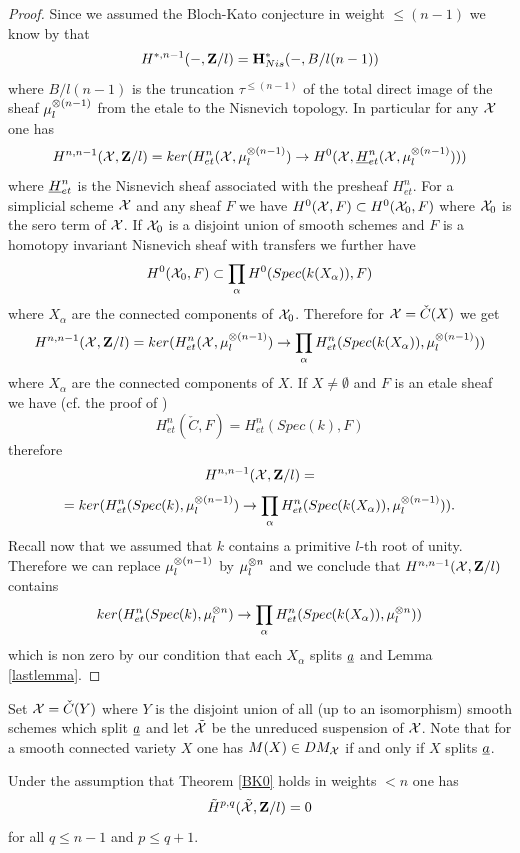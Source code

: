 \documentclass[11pt]{article}
\begin{document}
\begin{proof}
Since we assumed the Bloch-Kato conjecture in weight $\le (n-1)$ we
know by \cite{MCpub} that 
%
$$H^{*,n-1}(-,{\bf Z\rm}/l)={\bf H}^{*}_{Nis}(-,B/l(n-1))$$
%
where $B/l(n-1)$ is the truncation $\tau^{\le(n-1)}$ of the total
direct image of the sheaf $\mu_l^{\otimes(n-1)}$ from the etale to the
Nisnevich topology. In particular for any ${\cal X}$ one has
%
$$H^{n,n-1}({\cal X},{\bf Z\rm}/l)=ker(H^n_{et}({\cal X},\mu_l^{\otimes(n-1)})\rightarrow
H^0({\cal X}, \underline{H}^n_{et}({\cal X},\mu_l^{\otimes(n-1)})))$$
%
where $\underline{H}^n_{et}$ is the Nisnevich sheaf associated with the
presheaf $H^{n}_{et}$. For a simplicial scheme $\cal X$ and any
sheaf $F$ we have $H^0({\cal X},F)\subset H^0({\cal X}_0,F)$ where
${\cal X}_0$ is the sero term of $\cal X$. If ${\cal X}_0$ is a
disjoint union of smooth schemes and $F$ is a homotopy invariant
Nisnevich sheaf with transfers we further have
%
$$H^0({\cal X}_0,F)\subset \prod_{\alpha} H^0(Spec(k(X_{\alpha})),F)$$
%
where $X_{\alpha}$ are the connected components of ${\cal X}_0$.
%
Therefore for ${\cal X}=\check{C}(X)$ we get
%
$$H^{n,n-1}({\cal X},{\bf Z\rm}/l)=ker(H^n_{et}({\cal X},\mu_l^{\otimes(n-1)})\rightarrow
\prod_{\alpha} H^n_{et}(Spec(k(X_{\alpha})),\mu_l^{\otimes(n-1)}))$$
%
where $X_{\alpha}$ are the connected components of $X$. If $X\ne
\emptyset$ and $F$ is an etale sheaf we have (cf. the proof of \cite[Lemma
7.3]{MCpub})
%
$$H^{n}_{et}(\check{C},F)=H^n_{et}(Spec(k),F)$$
%
therefore  
%
$$H^{n,n-1}({\cal X},{\bf Z\rm}/l)=$$
$$=ker(H^n_{et}(Spec(k),\mu_l^{\otimes(n-1)})\rightarrow
\prod_{\alpha} H^n_{et}(Spec(k(X_{\alpha})),\mu_l^{\otimes(n-1)})).$$
%
Recall now that we assumed that $k$ contains a primitive $l$-th root
of unity. Therefore we can replace $\mu_l^{\otimes(n-1)}$ by $\mu_l^{\otimes
n}$ and we conclude that $H^{n,n-1}({\cal X},{\bf Z\rm}/l)$ contains 
%
$$ker(H^n_{et}(Spec(k),\mu_l^{\otimes n})\rightarrow
\prod_{\alpha} H^n_{et}(Spec(k(X_{\alpha})),\mu_l^{\otimes n}))$$
%
which is non zero by our condition that each $X_{\alpha}$ splits
$\underline{a}$ and Lemma \ref{lastlemma}.
\end{proof}
%
Set ${\cal X}=\check{C}(Y)$ where $Y$ is the disjoint union of all (up
to an isomorphism) smooth schemes which split $\underline{a}$ and let
$\tilde{\cal X}$ be the unreduced suspension of ${\cal X}$. Note that
for a smooth connected variety $X$ one has $M(X)\in DM_{\cal X}$ if
and only if $X$ splits $\underline{a}$.
%
\begin{lemma}
Under the assumption that Theorem \ref{BK0} holds in weights $< n$ one
has
%
$$\tilde{H}^{p,q}(\tilde{\cal X},{\bf Z\rm}/l)=0$$
%
for all $q\le n-1$ and $p\le q+1$.
\end{lemma}
\end{document}
